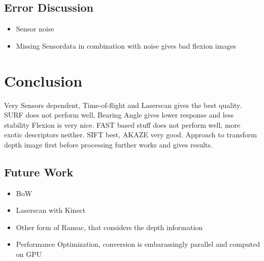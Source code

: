 \subsection{Error Discussion}
\begin{itemize}
    \item Sensor noise
    \item Missing Sensordata in combination with noise gives bad flexion images
\end{itemize}

\section{Conclusion}

Very Sensors dependent, Time-of-flight and Laserscan gives the best quality.
SURF does not perform well, Bearing Angle gives lower response and less stability
Flexion is very nice.
FAST based stuff does not perform well, more exotic descriptors neither.
SIFT best, AKAZE very good.
Approach to transform depth image first before processing further works and gives results.

\subsection{Future Work}

\begin{itemize}
    \item BoW
    \item Laserscan with Kinect
    \item Other form of Ransac, that considers the depth information
    \item Performance Optimization, conversion is embarassingly parallel and computed on GPU
\end{itemize}
